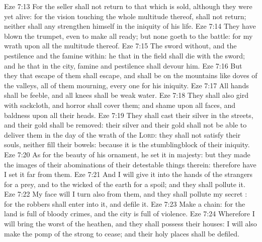 \vs Eze 7:13 For the seller shall not return to that which is sold, although they were yet alive: for the vision  touching the whole multitude thereof,  shall not return; neither shall any strengthen himself in the iniquity of his life.
\vs Eze 7:14 They have blown the trumpet, even to make all ready; but none goeth to the battle: for my wrath  upon all the multitude thereof.
\vs Eze 7:15 The sword  without, and the pestilence and the famine within: he that  in the field shall die with the sword; and he that  in the city, famine and pestilence shall devour him.
\vs Eze 7:16 But they that escape of them shall escape, and shall be on the mountains like doves of the valleys, all of them mourning, every one for his iniquity.
\vs Eze 7:17 All hands shall be feeble, and all knees shall be weak  water.
\vs Eze 7:18 They shall also gird  with sackcloth, and horror shall cover them; and shame  upon all faces, and baldness upon all their heads.
\vs Eze 7:19 They shall cast their silver in the streets, and their gold shall be removed: their silver and their gold shall not be able to deliver them in the day of the wrath of the \textsc{Lord}: they shall not satisfy their souls, neither fill their bowels: because it is the stumblingblock of their iniquity.
\vs Eze 7:20 As for the beauty of his ornament, he set it in majesty: but they made the images of their abominations  of their detestable things therein: therefore have I set it far from them.
\vs Eze 7:21 And I will give it into the hands of the strangers for a prey, and to the wicked of the earth for a spoil; and they shall pollute it.
\vs Eze 7:22 My face will I turn also from them, and they shall pollute my secret : for the robbers shall enter into it, and defile it.
\vs Eze 7:23 Make a chain: for the land is full of bloody crimes, and the city is full of violence.
\vs Eze 7:24 Wherefore I will bring the worst of the heathen, and they shall possess their houses: I will also make the pomp of the strong to cease; and their holy places shall be defiled.

